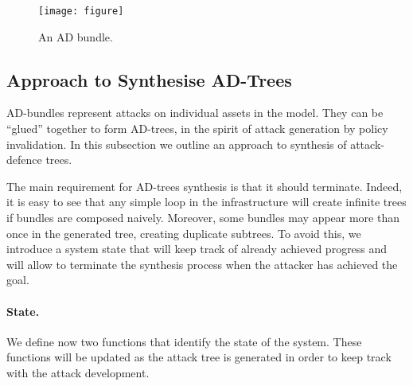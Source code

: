 \documentclass{llncs}
\begin{document}
\begin{figure}[htb]
\centering
\texttt{[image: figure]}
\caption{An AD bundle.}
\label{fig:bundle}
\end{figure}

\subsection{Approach to Synthesise AD-Trees}

AD-bundles represent attacks on individual assets in the model. They can be ``glued'' together to form AD-trees, in the spirit of attack generation by policy invalidation. In this subsection we outline an approach to synthesis of attack-defence trees.

The main requirement for AD-trees synthesis is that it should terminate. Indeed, it is easy to see that any simple loop in the infrastructure will create infinite trees if bundles are composed naively. Moreover, some bundles may appear more than once in the generated tree, creating duplicate subtrees. To avoid this, we introduce a system state that will keep track of already achieved progress and will allow to terminate the synthesis process when the attacker has achieved the goal. 



\paragraph{State.}
We define now two functions that identify the state of the system. These functions will be updated as the attack tree is generated in order to keep track with the attack development.

\iffalse{
We define a boolean function \Posesses{}{} $\subseteq$ $N_a$ $\times$ $N_o$:
\begin{itemize}
\item If $(o,a) \in E_{oa}$, and  \Posesses{a}{o} := \texttt{True}.
\item If for some $o_2 \in N_o$ $(o_1,o_2) \in E_{oo}$, and \Posesses{a}{o_2} = \texttt{True}, then \Posesses{a}{o_1} := \texttt{True}.
\item Else \Posesses{a}{n} = \texttt{False}.	
\end{itemize}
Intuitively, the function \Posesses{}{} refers to objects that an actor has.
}\fi
\end{document}
